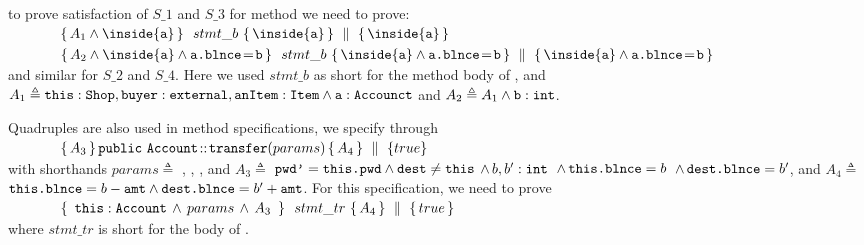 {\Eg to prove satisfaction of $S\_1$ and $S\_3$ for method  we  need to prove:
\\
$\strut \ \ \ \ \ \ \ \ \ \ \ \quadruple {A_1  \wedge \inside{\prg{a}} } {\ stmt\_b  \ } {\inside{\prg{a}}} { \inside{\prg{a}}} $
\\
$\strut \ \ \ \ \ \  \ \  \ \ \   \quadruple {A_2  \wedge  \inside{\prg{a}} \wedge  \prg{a.\balance}\!=\!{\prg{b}} } {\   stmt\_b  \  } {\inside{\prg{a}} \wedge  \prg{a.\balance}\!=\!\prg{b}}   
                         {  \inside{\prg{a}} \wedge  \prg{a.\balance}\!=\!\prg{b} }$
\\
and similar for $S\_2$ and $S\_4$. Here we used   $stmt\_b$  as short for the method body of , and $A_1 \triangleq \mbox{\normalfont{\texttt{this}}}:\mbox{\normalfont{\texttt{Shop}}}, \mbox{\normalfont{\texttt{buyer}}}:\mbox{\normalfont{\texttt{external}}}, \mbox{\normalfont{\texttt{anItem}}}:\mbox{\normalfont{\texttt{Item}}} \wedge \mbox{\normalfont{\texttt{a}}}:\mbox{\normalfont{\texttt{Accounct}}}$
and $A_2 \triangleq A_1 \wedge \mbox{\normalfont{\texttt{b}}}:\mbox{\normalfont{\texttt{int}}}$.
 
Quadruples are also used in method specifications, \eg we specify  through
\\
$\strut \ \ \ \ \ \  \ \  \ \ \  { \mprepostLongN {A_3}{\prg{public}\ \prg{Account}}{\prg{transfer}}{params}{A_4} {true} }$
\\
with shorthands 
$params \triangleq$ , , , and 
$A_3  \triangleq$  $\mbox{\normalfont{\texttt{pwd'}}}=\mbox{\normalfont{\texttt{this.\mbox{\normalfont{\texttt{pwd}}}}}} \wedge \mbox{\normalfont{\texttt{dest}}}\neq \mbox{\normalfont{\texttt{this}}}$
$\wedge\, b, b':\mbox{\normalfont{\texttt{int}}}$
$\, \wedge\, \mbox{\normalfont{\texttt{this.\mbox{\normalfont{\texttt{blnce}}}}}}=b$ 
$\, \wedge\,  \mbox{\normalfont{\texttt{dest.\mbox{\normalfont{\texttt{blnce}}}}}}=b'$, 
 and $A_4 \triangleq$  
 $\mbox{\normalfont{\texttt{this.\mbox{\normalfont{\texttt{blnce}}}}}}=b-\mbox{\normalfont{\texttt{amt}}} \wedge \mbox{\normalfont{\texttt{dest.\mbox{\normalfont{\texttt{blnce}}}}}}=b'+\mbox{\normalfont{\texttt{amt}}}$.
For this specification, we need to prove\\
$\strut \ \ \ \ \ \ \ \ \ \ \ \quadruple {\ \prg{this}:\prg{Account}\, \wedge\, params\, \wedge\, A_3  \  } {\ stmt\_{tr}  \ } {A_4} { true} $
\\
where $stmt\_{tr}$ is short for the body of  .



}
